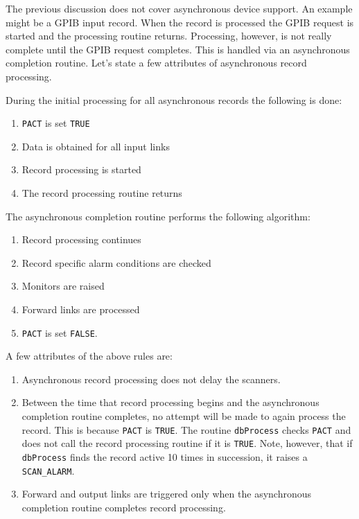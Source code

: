 The previous discussion does not cover asynchronous device support.
An example might be a GPIB input record.
When the record is processed the GPIB request is started and the processing routine returns.
Processing, however, is not really complete until the GPIB request completes.
This is handled via an asynchronous completion routine.
Let's state a few attributes of asynchronous record processing.

During the initial processing for all asynchronous records the following is done:

\begin{enumerate}
\item \verb|PACT| is set \verb|TRUE|

\item Data is obtained for all input links

\item Record processing is started

\item The record processing routine returns

\end{enumerate}

The asynchronous completion routine performs the following algorithm:

\begin{enumerate}
\item Record processing continues

\item Record specific alarm conditions are checked

\item Monitors are raised

\item Forward links are processed

\item \verb|PACT| is set \verb|FALSE|.

\end{enumerate}

A few attributes of the above rules are:

\begin{enumerate}
\item Asynchronous record processing does not delay the scanners.

\item Between the time that record processing begins and the asynchronous completion routine completes, no attempt will be made to again process the record.
This is because \verb|PACT| is \verb|TRUE|.
The routine \verb|dbProcess| checks \verb|PACT| and does not call the record processing routine if it is \verb|TRUE|.
Note, however, that if \verb|dbProcess| finds the record active 10 times in succession, it raises a \verb|SCAN_ALARM|.

\item Forward and output links are triggered only when the asynchronous completion routine completes record processing.

\end{enumerate}

